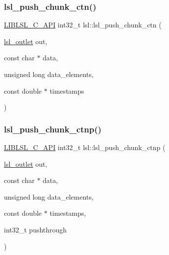 \subsubsection{\texorpdfstring{lsl\+\_\+push\+\_\+chunk\+\_\+ctn()}{lsl\_push\_chunk\_ctn()}}
{\footnotesize\ttfamily \hyperlink{lsl__cpp_8h_aafd0ef1813e8be84a1420c4f1df64615}{L\+I\+B\+L\+S\+L\+\_\+\+C\+\_\+\+A\+PI} int32\+\_\+t lsl\+::lsl\+\_\+push\+\_\+chunk\+\_\+ctn (\begin{DoxyParamCaption}\item[{\hyperlink{namespacelsl_abcf512b0f66dacf86c10b165995fd50b}{lsl\+\_\+outlet}}]{out,  }\item[{const char $\ast$}]{data,  }\item[{unsigned long}]{data\+\_\+elements,  }\item[{const double $\ast$}]{timestamps }\end{DoxyParamCaption})}

\mbox{\label{namespacelsl_a1ce559595e2b4ac431bda67fc49ec102}} 
\subsubsection{\texorpdfstring{lsl\+\_\+push\+\_\+chunk\+\_\+ctnp()}{lsl\_push\_chunk\_ctnp()}}
{\footnotesize\ttfamily \hyperlink{lsl__cpp_8h_aafd0ef1813e8be84a1420c4f1df64615}{L\+I\+B\+L\+S\+L\+\_\+\+C\+\_\+\+A\+PI} int32\+\_\+t lsl\+::lsl\+\_\+push\+\_\+chunk\+\_\+ctnp (\begin{DoxyParamCaption}\item[{\hyperlink{namespacelsl_abcf512b0f66dacf86c10b165995fd50b}{lsl\+\_\+outlet}}]{out,  }\item[{const char $\ast$}]{data,  }\item[{unsigned long}]{data\+\_\+elements,  }\item[{const double $\ast$}]{timestamps,  }\item[{int32\+\_\+t}]{pushthrough }\end{DoxyParamCaption})}

\mbox{\label{namespacelsl_ad8287dab0124b1f1d8a682e914116550}} 
